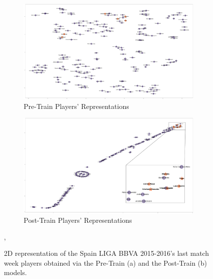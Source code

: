 \documentclass{article}
\begin{document}
\begin{figure}[!ht]
    \centering
    \begin{subfigure}{0.45\linewidth}
        \includegraphics[width=\linewidth]{players_pretrain.pdf}
        \caption{Pre-Train Players' Representations}
    \end{subfigure}
    \begin{subfigure}{0.45\linewidth}
        \includegraphics[width=\linewidth]{players.pdf}
        \caption{Post-Train Players' Representations}
    \end{subfigure}
 
     \caption{2D representation of the Spain LIGA BBVA 2015-2016's last match week players obtained via the Pre-Train (a) and the Post-Train (b) models.},
\label{fig:playerVisualization}
\end{figure}


\end{document}
